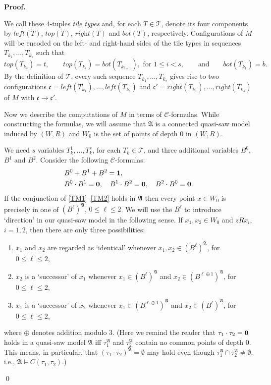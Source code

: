 \documentclass{LMCS}
\renewenvironment{proof}{\par\noindent\textbf{Proof.}}{\mbox{}\qed\par\medskip}
\theoremstyle{plain}
\newcommand{\cBC}{\ensuremath{\mathcal{C}}}
\newcommand{\fA}{\mathfrak{A}}\newcommand{\fB}{\mathfrak{B}}\newcommand{\fM}{\mathfrak{M}}\newcommand{\cK}{\mathcal{K}}\newcommand{\R}{\mathbb{R}}\newcommand{\cR}{\mathcal{R}}\newcommand{\cL}{\mathcal{L}}\newcommand{\cLc}{\mathcal{L}c}\newcommand{\cLcc}{\mathcal{L}cc}
\begin{document}
\begin{proof}
\begin{figure}[ht]
\end{figure}
We call these 4-tuples \emph{tile types} and, for each $T \in \mathcal{T}$, denote its four
components by $\textit{left}(T)$, $\textit{top}(T)$,
$\textit{right}(T)$ and $\textit{bot}(T)$, respectively.
Configurations of $M$ will be encoded on the left- and
right-hand sides of the tile types in sequences
$T_{k_1},\dots,T_{k_s}$ such that
\begin{equation}\label{eq:tm:tiling}
\textit{top}(T_{k_s}) = t, \qquad \textit{top}(T_{k_i}) = \textit{bot}(T_{k_{i+1}}), \text{ for } 1 \leq i < s,\qquad\text{and}\qquad
\textit{bot}(T_{k_1}) = b.
\end{equation}
By the definition of $\mathcal{T}$, every such sequence $T_{k_1},\dots,T_{k_s}$ gives rise to two configurations $\mathfrak c = \textit{left}(T_{k_1}),\dots,\textit{left}(T_{k_s})$ and $\mathfrak c' =
\textit{right}(T_{k_1}),\dots,\textit{right}(T_{k_s})$ of $M$ with $\mathfrak c \to \mathfrak c'$.

Now we describe the computations of $M$ in terms of
\cBC{}-formulas. While constructing the formulas,
we will assume that $\mathfrak A$ is a connected quasi-saw model induced by
$(W,R)$ and $W_0$ is the set of points of
depth $0$ in $(W,R)$.

We need $s$ variables $T_k^1,\dots,T_k^s$, for
each $T_k\in \mathcal{T}$, and three additional variables $B^0$, $B^1$ and
$B^2$. Consider the following \cBC{}-formulas: 
\begin{align}
\label{TM1}
& B^0 + B^1 + B^2 = \mathbf{1},\\
\label{TM2}
& B^0 \cdot B^1 = \mathbf{0},\quad B^1 \cdot B^2 = \mathbf{0}, \quad B^2 \cdot B^0 = \mathbf{0}.
\end{align}
If the conjunction of \eqref{TM1}--\eqref{TM2} holds in $\mathfrak{A}$
then every point $x\in W_0$ is precisely in one of
$(B^\ell)^\mathfrak{A}$, $0 \leq \ell \leq 2$.  We will use the
$B^\ell$ to introduce `direction' in our quasi-saw model in the
following sense.  If $x_1,x_2\in W_0$ and $zRx_i$, $i = 1,2$, then
there are only three possibilities:
\begin{enumerate}[$\bullet$]
\item $x_1$ and $x_2$ are regarded as `identical' whenever $x_1,x_2\in (B^\ell)^\fA$, for $0 \leq \ell \leq 2$,
\item $x_2$ is a `successor' of $x_1$  whenever $x_1\in (B^\ell)^\fA$ and
$x_2 \in (B^{\ell \oplus 1})^\fA$, for $0 \leq \ell \leq 2$,
\item $x_1$ is a `successor' of $x_2$ whenever $x_1 \in (B^{\ell \oplus 1})^\fA$ and $x_2\in (B^\ell)^\fA$, for $0 \leq \ell \leq 2$,
\end{enumerate}
where $\oplus$ denotes addition modulo 3.
(Here we remind the reader that $\tau_1 \cdot \tau_2 = \mathbf{0}$ holds
in a quasi-saw model $\mathfrak A$ iff $\tau_1^{\mathfrak A}$ and
$\tau_2^{\mathfrak A}$ contain no common points of depth 0. This
means, in particular, that $(\tau_1 \cdot \tau_2)^\mathfrak{A} = \emptyset$ may hold
even though $\tau_1^\mathfrak{A} \cap \tau_2^\mathfrak{A} \ne
\emptyset$, i.e., $\mathfrak{A} \models C(\tau_1,\tau_2)$.)


\end{proof}
\end{document}
